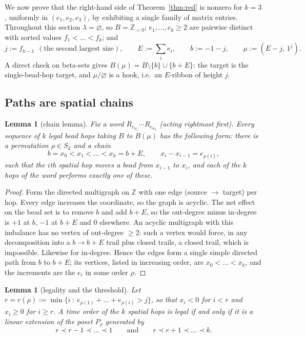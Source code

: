 \documentclass[11pt]{article}
\newtheorem{lemma}[theorem]{Lemma}
\theoremstyle{definition}
\newcommand{\Z}{\mathbb{Z}}
\begin{document}
We now prove that the right-hand side of Theorem~\ref{thm:red} is nonzero for $k=3$, uniformly in
$(e_1,e_2,e_3)$, by exhibiting a single family of matrix entries. Throughout this section
$\lambda=\varnothing$, so $B=\Z_{<0}$; $e_1,\dots,e_k\ge2$ are pairwise distinct with sorted values
$f_1<\dots<f_k$; and
\[
j:=f_{k-1}\ \ (\text{the second largest size}),\qquad E:=\textstyle\sum_i e_i,\qquad
b:=-1-j,\qquad \mu:=(E-j,\,1^{j}).
\]
A direct check on beta-sets gives $B(\mu)=B\setminus\{b\}\cup\{b+E\}$: the target is the
single-bead-hop target, and $\mu/\varnothing$ is a hook, i.e.\ an $E$-ribbon of height $j$.

\subsection{Paths are spatial chains}

\begin{lemma}[chain lemma]\label{lem:chain}
Fix a word $R_{e_{w_1}}\cdots R_{e_{w_k}}$ (acting rightmost first). Every sequence of $k$ legal
bead hops taking $B$ to $B(\mu)$ has the following form: there is a permutation $\rho\in S_k$ and
a chain
\[
b=x_0<x_1<\dots<x_k=b+E,\qquad x_i-x_{i-1}=e_{\rho(i)},
\]
such that the $i$th \emph{spatial} hop moves a bead from $x_{i-1}$ to $x_i$, and each of the $k$
hops of the word performs exactly one of these.
\end{lemma}

\begin{proof}
Form the directed multigraph on $\Z$ with one edge (source $\to$ target) per hop. Every edge
increases the coordinate, so the graph is acyclic. The net effect on the bead set is to remove
$b$ and add $b+E$, so the out-degree minus in-degree is $+1$ at $b$, $-1$ at $b+E$ and $0$
elsewhere. An acyclic multigraph with this imbalance has no vertex of out-degree $\ge2$: such a
vertex would force, in any decomposition into a $b\to b+E$ trail plus closed trails, a closed
trail, which is impossible. Likewise for in-degree. Hence the edges form a single simple directed
path from $b$ to $b+E$; its vertices, listed in increasing order, are $x_0<\dots<x_k$, and the
increments are the $e_i$ in some order $\rho$.
\end{proof}

\begin{lemma}[legality and the threshold]\label{lem:legal}
Let $r=r(\rho):=\min\{i\ :\ e_{\rho(1)}+\dots+e_{\rho(i)}>j\}$, so that $x_i<0$ for $i<r$ and
$x_i\ge0$ for $i\ge r$. A time order of the $k$ spatial hops is legal if and only if it is a
linear extension of the poset $P_\rho$ generated by
\[
r\prec r-1\prec\dots\prec1
\qquad\text{and}\qquad
r\prec r+1\prec\dots\prec k .
\]
\end{lemma}
\end{document}
